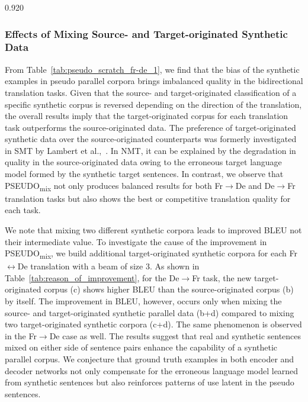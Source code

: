\documentclass[11pt,letterpaper]{article}
\newcommand{\mylinespacing}{0.920}
\begin{document}
\begin{spacing}{\mylinespacing}
\subsubsection{Effects of Mixing Source- and Target-originated Synthetic Data}
From Table~\ref{tab:pseudo_scratch_fr-de_1}, we find that the bias of the synthetic examples in pseudo parallel corpora brings imbalanced quality in the bidirectional translation tasks. Given that the source- and target-originated classification of a specific synthetic corpus is reversed depending on the direction of the translation, the overall results imply that the target-originated corpus for each translation task outperforms the source-originated data. The preference of target-originated synthetic data over the source-originated counterparts was formerly investigated in SMT by Lambert et al.,~. In NMT, it can be explained by the degradation in quality in the source-originated data owing to the erroneous target language model formed by the synthetic target sentences. In contrast, we observe that PSEUDO\textsubscript{mix} not only produces balanced results for both Fr\(\rightarrow\)De and De\(\rightarrow\)Fr translation tasks but also shows the best or competitive translation quality for each task.

We note that mixing two different synthetic corpora leads to improved BLEU not their intermediate value. To investigate the cause of the improvement in PSEUDO\textsubscript{mix}, we build additional target-originated synthetic corpora for each Fr\(\leftrightarrow\)De translation with a beam of size 3. As shown in Table~\ref{tab:reason_of_improvement}, for the De\(\rightarrow\)Fr task, the new target-originated corpus (c) shows higher BLEU than the source-originated corpus (b) by itself. The improvement in BLEU, however, occurs only when mixing the source- and target-originated synthetic parallel data (b+d) compared to mixing two target-originated synthetic corpora (c+d). The same phenomenon is observed in the Fr\(\rightarrow\)De case as well. The results suggest that real and synthetic sentences mixed on either side of sentence pairs enhance the capability of a synthetic parallel corpus. We conjecture that ground truth examples in both encoder and decoder networks not only compensate for the erroneous language model learned from synthetic sentences but also reinforces patterns of use latent in the pseudo sentences.


\end{spacing}
\end{document}

